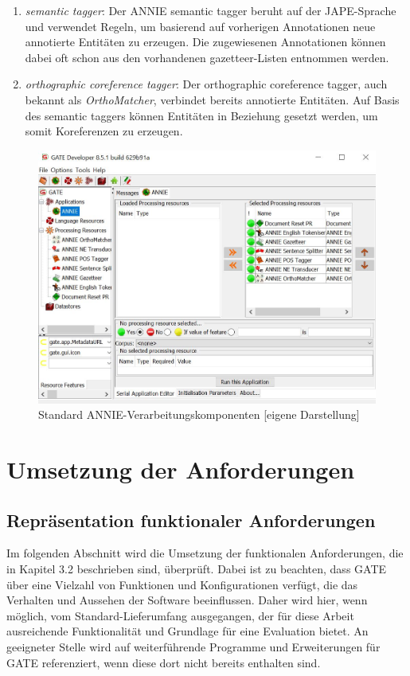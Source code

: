 \documentclass[12pt]{report}
\begin{document}
\begin{enumerate}
\item \textit{semantic tagger}: Der ANNIE semantic tagger beruht auf der JAPE-Sprache und verwendet Regeln, um basierend auf vorherigen Annotationen neue annotierte Entitäten zu erzeugen. Die zugewiesenen Annotationen können dabei oft schon aus den vorhandenen gazetteer-Listen entnommen werden. 

\item \textit{orthographic coreference tagger}: Der orthographic coreference tagger, auch bekannt als \textit{OrthoMatcher}, verbindet bereits annotierte Entitäten. Auf Basis des semantic taggers können Entitäten in Beziehung gesetzt werden, um somit Koreferenzen zu erzeugen.

\end{enumerate}
\begin{figure}[h!]
\begin{center}
\includegraphics[scale=0.65]{GATE_Bilder/ANNIE2.jpg}
\caption{Standard ANNIE-Verarbeitungskomponenten [eigene Darstellung]}
\end{center}
\end{figure}


\section{Umsetzung der Anforderungen}

\subsection{Repräsentation funktionaler Anforderungen}
Im folgenden Abschnitt wird die Umsetzung der funktionalen Anforderungen, die in Kapitel 3.2 beschrieben sind, überprüft. Dabei ist zu beachten, dass GATE über eine Vielzahl von Funktionen und Konfigurationen verfügt, die das Verhalten und Aussehen der Software beeinflussen. Daher wird hier, wenn möglich, vom Standard-Lieferumfang ausgegangen, der für diese Arbeit ausreichende Funktionalität und Grundlage für eine Evaluation bietet. An geeigneter Stelle wird auf weiterführende Programme und Erweiterungen für GATE referenziert, wenn diese dort nicht bereits enthalten sind.
\end{document}
